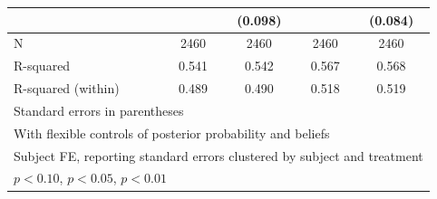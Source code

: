 \begin{table}[htbp]
\begin{tabular}{l*{4}{c}}
                &                  &  (0.098)         &                  &  (0.084)         \\
\hline
N               &     2460         &     2460         &     2460         &     2460         \\
R-squared       &    0.541         &    0.542         &    0.567         &    0.568         \\
R-squared (within)&    0.489         &    0.490         &    0.518         &    0.519         \\
\hline\hline
\multicolumn{5}{l}{\footnotesize Standard errors in parentheses}\\
\multicolumn{5}{l}{\footnotesize With flexible controls of posterior probability and beliefs}\\
\multicolumn{5}{l}{\footnotesize Subject FE, reporting standard errors clustered by subject and treatment}\\
\multicolumn{5}{l}{\footnotesize \sym{*} \(p<0.10\), \sym{**} \(p<0.05\), \sym{***} \(p<0.01\)}\\
\end{tabular}
\end{table}
